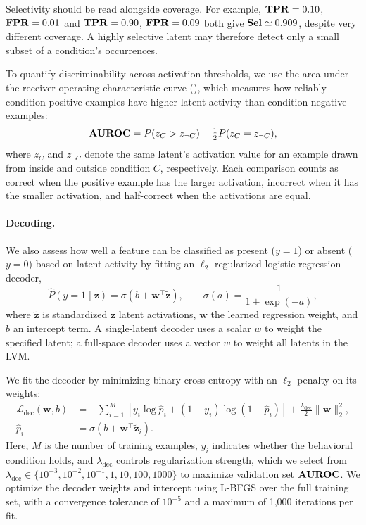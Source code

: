 Selectivity should be read alongside coverage. For example, $\mathbf{TPR}=0.10$, $\mathbf{FPR}=0.01$ and $\mathbf{TPR}=0.90$, $\mathbf{FPR}=0.09$ both give $\mathbf{Sel}\simeq0.909$, despite very different coverage. A highly selective latent may therefore detect only a small subset of a condition's occurrences.

\label{paragraph:latent_discrimination}
To quantify discriminability across activation thresholds, we use the area under the receiver operating characteristic curve (), which measures how reliably condition-positive examples have higher latent activity than condition-negative examples:
\begin{equation}
\label{eq:latent_auroc}
\mathbf{AUROC}=P(z_C>z_{\neg C})+\tfrac12P(z_C=z_{\neg C}),
\end{equation}
where $z_C$ and $z_{\neg C}$ denote the same latent's activation value for an example drawn from inside and outside condition $C$, respectively. Each comparison counts as correct when the positive example has the larger activation, incorrect when it has the smaller activation, and half-correct when the activations are equal.

\paragraph{Decoding.}
\label{paragraph:latent_decoding}
We also assess how well a feature can be classified as present ($y = 1$) or absent ($y = 0$) based on latent activity by fitting an $\ell_2$-regularized logistic-regression decoder,
\begin{equation}
\label{eq:latent_logistic_decoder}
\widehat P(y=1\mid\mathbf z)=\sigma\!\left(b+\mathbf w^\top\widetilde{\mathbf z}\right),
\qquad \sigma(a)=\frac{1}{1+\exp(-a)},
\end{equation}
where $\widetilde{\mathbf{z}}$ is standardized $\mathbf{z}$ latent activations, $\mathbf w$ the learned regression weight, and $b$ an intercept term. A single-latent decoder uses a scalar $w$ to weight the specified latent; a full-space decoder uses a vector $w$ to weight all latents in the LVM.


We fit the decoder by minimizing binary cross-entropy with an $\ell_2$ penalty on its weights:
\begin{equation}
\label{eq:latent_decoder_loss}
\begin{aligned}
\mathcal L_{\mathrm{dec}}(\mathbf w,b)
&= -\sum_{i=1}^{M}\left[y_i\log\widehat p_i+(1-y_i)\log(1-\widehat p_i)\right]
+\frac{\lambda_{\mathrm{dec}}}{2}\|\mathbf w\|_2^2,\\
\widehat p_i &= \sigma\!\left(b+\mathbf w^\top\widetilde{\mathbf z}_i\right).
\end{aligned}
\end{equation}
Here, $M$ is the number of training examples, $y_i$ indicates whether the behavioral condition holds, and $\lambda_{\mathrm{dec}}$ controls regularization strength, which we select from \(\lambda_{\mathrm{dec}}\in\{10^{-3},10^{-2},10^{-1},1,10,100,1000\}\) to maximize validation set \(\mathbf{AUROC}\). We optimize the decoder weights and intercept using L-BFGS over the full training set, with a convergence tolerance of $10^{-5}$ and a maximum of 1,000 iterations per fit.

